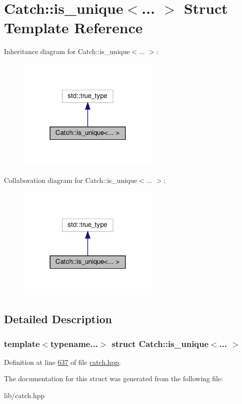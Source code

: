 \hypertarget{structCatch_1_1is__unique}{}\section{Catch\+::is\+\_\+unique$<$... $>$ Struct Template Reference}
\label{structCatch_1_1is__unique}


Inheritance diagram for Catch\+::is\+\_\+unique$<$... $>$\+:
\nopagebreak
\begin{figure}[H]
\begin{center}
\leavevmode
\includegraphics[width=194pt]{structCatch_1_1is__unique__inherit__graph}
\end{center}
\end{figure}


Collaboration diagram for Catch\+::is\+\_\+unique$<$... $>$\+:
\nopagebreak
\begin{figure}[H]
\begin{center}
\leavevmode
\includegraphics[width=194pt]{structCatch_1_1is__unique__coll__graph}
\end{center}
\end{figure}


\subsection{Detailed Description}
\subsubsection*{template$<$typename...$>$\newline
struct Catch\+::is\+\_\+unique$<$... $>$}



Definition at line \mbox{\hyperlink{catch_8hpp_source_l00637}{637}} of file \mbox{\hyperlink{catch_8hpp_source}{catch.\+hpp}}.



The documentation for this struct was generated from the following file\+:\begin{DoxyCompactItemize}
\item 
lib/catch.\+hpp\end{DoxyCompactItemize}

